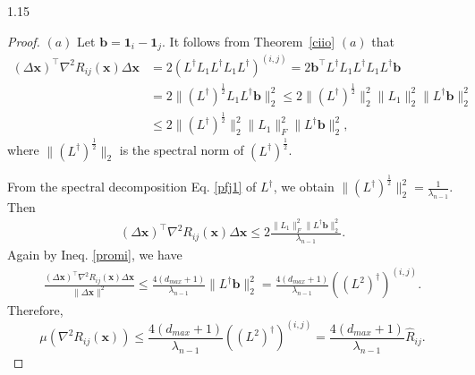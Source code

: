 \documentclass[preprint,12pt]{elsarticle1}
\numberwithin{equation}{section}
\begin{document}
\begin{spacing}{1.15}
\begin{proof}
$(a)$
Let $\textbf{b}=\textbf{1}_{i}-\textbf{1}_{j}$.
 It follows from Theorem~\ref{ciio} $(a)$ that
\begin{align}\nonumber (\Delta \textbf{x})^{\top}\nabla^{2}R_{ij}(\mathbf{x})\Delta \textbf{x}&=2(L^{\dag}L_{1}L^{\dag}L_{1}L^{\dag})^{(i,j)}
=2\textbf{b}^{\top}L^{\dag}L_{1}L^{\dag}L_{1}L^{\dag}\textbf{b}\\ \nonumber
&=2\|(L^{\dag})^{\frac{1}{2}}L_{1}L^{\dag}\textbf{b}\|^{2}_{2}
\leq2\|(L^{\dag})^{\frac{1}{2}}\|_{2}^{2} \|L_{1}\|_{2}^{2} \|L^{\dag}\textbf{b}\|_{2}^{2}\\ \nonumber
&\leq 2\|(L^{\dag})^{\frac{1}{2}}\|_{2}^{2} \|L_{1}\|_{F}^{2} \|L^{\dag}\textbf{b}\|_{2}^{2},
\end{align} where $\|(L^{\dag})^{\frac{1}{2}}\|_{2}$ is the spectral norm of $(L^{\dag})^{\frac{1}{2}}$.


From the spectral decomposition Eq. \eqref{pfj1} of $L^{\dag}$, we obtain  $\|(L^{\dag})^{\frac{1}{2}}\|_{2}^{2}=\frac{1}{\lambda_{n-1}}.$ Then
\begin{align}\nonumber
(\Delta \textbf{x})^{\top}\nabla^{2}R_{ij}(\mathbf{x})\Delta \textbf{x}\leq 2\frac{ \|L_{1}\|_{F}^{2} \|L^{\dag}\textbf{b}\|_{2}^{2}}{\lambda_{n-1}}.
\end{align}
Again by  Ineq.  \eqref{promi}, we have \begin{align}\label{end1} \frac{(\Delta \textbf{x})^{\top}\nabla^{2}R_{ij}(\mathbf{x})\Delta \textbf{x}}{\|\Delta \textbf{x}\|^{2}}\leq\frac{4(d_{max}+1)}{\lambda_{n-1}}
\|L^{\dag}\textbf{b}\|_{2}^{2}=\frac{4(d_{max}+1)}{\lambda_{n-1}}((L^{2})^{\dag})^{(i,j)}.\end{align}
Therefore, $$\mu(\nabla^{2}R_{ij}(\mathbf{x}))\leq \frac{4(d_{max}+1)}{\lambda_{n-1}}((L^{2})^{\dag})^{(i,j)}=\frac{4(d_{max}+1)}{\lambda_{n-1}}\widehat{R}_{ij}.$$



\end{proof}
\end{spacing}
\end{document}
